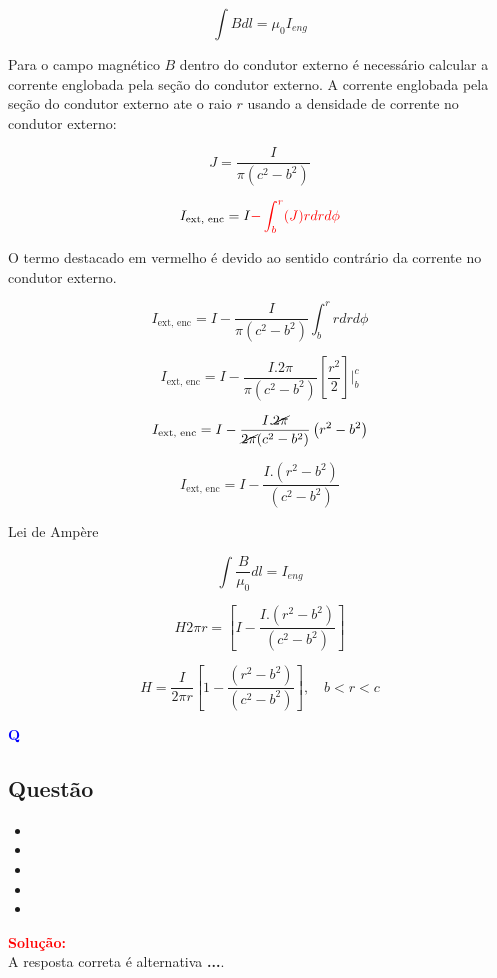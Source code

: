 \begin{flushleft}
\[
\int B dl = \mu_{0}I_{eng}
\]

Para o campo magnético \(B\) dentro do condutor externo \'e necess\'ario 
calcular a corrente englobada pela seção do condutor externo. A corrente englobada pela seção do 
condutor externo ate o raio \(r\) usando a densidade de corrente no condutor externo:

\[
J = \frac{I}{\pi(c^{2} - b^{2})}
\]

\[
I_{\text{ext, enc}} = I \textcolor{red}{- \int_{b}^{r} (J) rdrd\phi}
\]

O termo destacado em vermelho \'e devido ao sentido contrário da corrente no condutor externo.

\[
I_{\text{ext, enc}} = I - \frac{I}{\pi(c^{2} - b^{2})}\int_{b}^{r} rdrd\phi
\]

\[
I_{\text{ext, enc}} = I - \frac{I.2\pi}{\pi(c^{2} - b^{2})}\left[\frac{r^2}{2}\right]\Big|_{b}^{c}
\]

\[
I_{\text{ext, enc}} = I - \frac{I.\cancel{2\pi}}{\cancel{2\pi}(c^{2} - b^{2})}\left(r^{2} - b^{2}\right)
\]

\[
I_{\text{ext, enc}} = I - \frac{I.\left(r^{2} - b^{2}\right)}{(c^{2} - b^{2})}
\]

Lei de Ampère

\[
\int \frac{B}{\mu_{0}} dl = I_{eng}
\]

\[
H 2\pi r = \left[I - \frac{I.\left(r^{2} - b^{2}\right)}{(c^{2} - b^{2})}\right]
\]

\[
\boxed{
H  = \frac{I}{2\pi r}\left[1 - \frac{\left(r^{2} - b^{2}\right)}{(c^{2} - b^{2})}\right], \quad \textrm{\(b < r < c\)}
}
\]

\end{flushleft}

\begin{flushleft}
\textbf{\textcolor{blue}{\Large Q}}\\
\noindent

\subsection{Quest\~ao }

\begin{itemize}
\item[(A)] 
\item[(B)] 
\item[(C)] 
\item[(D)] 
\item[(E)] 
\end{itemize}

\vspace{0.5cm}

\textcolor{red}{\textbf{Solução:}}\\

A resposta correta é alternativa \colorbox{green!50}{\textbf{...}}.
\end{flushleft}